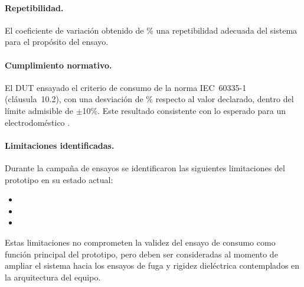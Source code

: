 \paragraph{Repetibilidad.}
El coeficiente de variación obtenido de \%
 una repetibilidad adecuada
del sistema para el propósito del ensayo.

\paragraph{Cumplimiento normativo.}
El DUT ensayado  el criterio de
consumo de la norma IEC~60335-1 (cláusula~10.2), con una desviación
de \% respecto al valor declarado,
dentro del límite admisible de $\pm$10\%.
Este resultado  consistente con lo esperado
para un electrodoméstico .

\paragraph{Limitaciones identificadas.}
Durante la campaña de ensayos se identificaron las siguientes
limitaciones del prototipo en su estado actual:

\begin{itemize}
    \item {}
    \item {}
    \item {}
\end{itemize}

Estas limitaciones no comprometen la validez del ensayo de consumo
como función principal del prototipo, pero deben ser consideradas
al momento de ampliar el sistema hacia los ensayos de fuga y
rigidez dieléctrica contemplados en la arquitectura del equipo.

